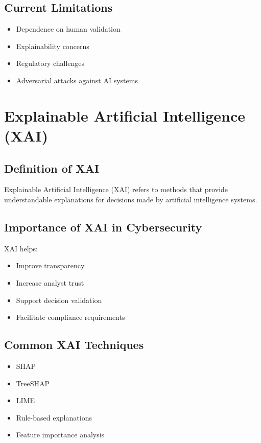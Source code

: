 \documentclass[12pt,a4paper]{report}
\begin{document}
\subsection{Current Limitations}
\begin{itemize}
    \item Dependence on human validation
    \item Explainability concerns
    \item Regulatory challenges
    \item Adversarial attacks against AI systems
\end{itemize}

\section{Explainable Artificial Intelligence (XAI)}
\label{sec:xai}

\subsection{Definition of XAI}
Explainable Artificial Intelligence (XAI) refers to methods that provide understandable explanations for decisions made by artificial intelligence systems.

\subsection{Importance of XAI in Cybersecurity}
XAI helps:
\begin{itemize}
    \item Improve transparency
    \item Increase analyst trust
    \item Support decision validation
    \item Facilitate compliance requirements
\end{itemize}

\subsection{Common XAI Techniques}
\begin{itemize}
    \item SHAP
    \item TreeSHAP
    \item LIME
    \item Rule-based explanations
    \item Feature importance analysis
\end{itemize}
\end{document}

